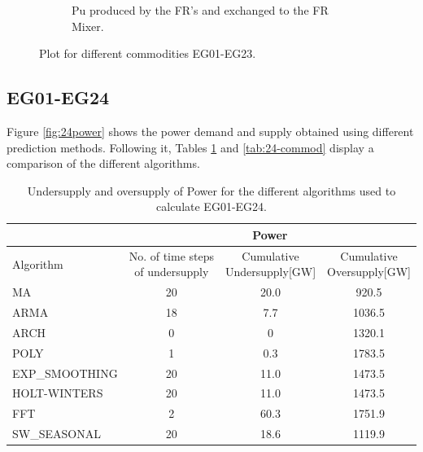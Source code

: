 \documentclass[11pt,letterpaper]{article}
\begin{document}
\begin{figure}[]
\begin{subfigure}[t]{.45\textwidth}
	\caption{Pu produced by the FR's and exchanged to the FR Mixer.}
	\label{fig:23-arch-frpu}
\end{subfigure}
	\hfill
	\caption{Plot for different commodities EG01-EG23.}
	\label{fig:23-arch-commod}
\end{figure}

\subsection{EG01-EG24}

Figure \ref{fig:24power} shows the power demand and supply obtained using different prediction methods. Following it, Tables \ref{tab:24-power} and \ref{tab:24-commod} display a comparison of the different algorithms.

\begin{table}[]
	\centering
	\caption {Undersupply and oversupply of Power for the different algorithms used to calculate EG01-EG24.}
	\label{tab:24-power}
	\begin{tabular}{|l|c|c|c|}
		\hline
		& \multicolumn{3}{c|}{Power} \\ \hline
		Algorithm & \shortstack{No. of time steps\\of undersupply}  & 
		\shortstack{Cumulative\\Undersupply[GW]}  & \shortstack{Cumulative\\Oversupply[GW]} \\ \hline
		MA        & 20 	& 20.0  &  920.5   \\ \hline
		ARMA      & 18 	&  7.7  &  1036.5  \\ \hline
		ARCH      &  0 	&   0  	&  1320.1  \\ \hline
		POLY      &  1 	&  0.3 	&  1783.5  \\ \hline
		EXP\_SMOOTHING 	& 20 	& 11.0 & 1473.5 \\ \hline
		HOLT-WINTERS  	& 20 	& 11.0 & 1473.5 \\ \hline
		FFT       & 2 	& 60.3 	& 1751.9	\\ \hline
		SW\_SEASONAL    & 20 	& 18.6 	& 1119.9 	\\ \hline
	\end{tabular}
\end{table}
\end{document}
